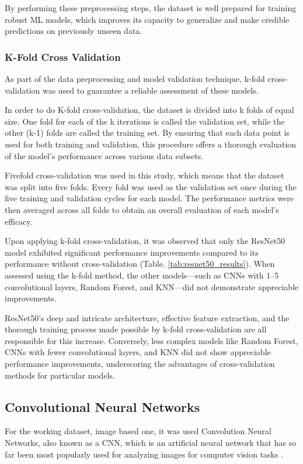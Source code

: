 \documentclass[conference]{IEEEtran}
\begin{document}
By performing these preprocessing steps, the dataset is well prepared for training robust \ac{ML} models, which improves its capacity to generalize and make credible predictions on previously unseen data.

\subsubsection{K-Fold Cross Validation}
As part of the data preprocessing and model validation technique, k-fold cross-validation was used to guarantee a reliable assessment of these models.

In order to do K-fold cross-validation, the dataset is divided into k folds of equal size. One fold for each of the k iterations is called the validation set, while the other (k-1) folds are called the training set. By ensuring that each data point is used for both training and validation, this procedure offers a thorough evaluation of the model's performance across various data subsets.

Fivefold cross-validation was used in this study, which means that the dataset was split into five folds. Every fold was used as the validation set once during the five training and validation cycles for each model. The performance metrics were then averaged across all folds to obtain an overall evaluation of each model's efficacy.

Upon applying k-fold cross-validation, it was observed that only the ResNet50 model exhibited significant performance improvements compared to its performance without cross-validation (Table. \ref{tab:resnet50_results}). When assessed using the k-fold method, the other models—such as CNNs with 1–5 convolutional layers, Random Forest, and KNN—did not demonstrate appreciable improvements.

ResNet50's deep and intricate architecture, effective feature extraction, and the thorough training process made possible by k-fold cross-validation are all responsible for this increase. Conversely, less complex models like Random Forest, CNNs with fewer convolutional layers, and KNN did not show appreciable performance improvements, underscoring the advantages of cross-validation methods for particular models.



\subsection{Convolutional Neural Networks}
For the working dataset, image based one, it was used Convolution Neural Networks, also known as a \ac{CNN}, which is an artificial neural network that has so far been most popularly used for analyzing images for computer vision tasks \cite{deeplizard}.
\end{document}
